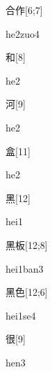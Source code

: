\begin{verbete}[he2zuo4]{合作}[6;7]
\begin{pronuncia}{he2zuo4}
\end{pronuncia}
\end{verbete}

\begin{verbete}[he2]{和}[8]
\begin{pronuncia}{he2}
\end{pronuncia}
\end{verbete}

\begin{verbete}[he2]{河}[9]
\begin{pronuncia}{he2}
\end{pronuncia}
\end{verbete}

\begin{verbete}[he2]{盒}[11]
\begin{pronuncia}{he2}
\end{pronuncia}
\end{verbete}

\begin{verbete}[hei1]{黑}[12]
\begin{pronuncia}{hei1}
\end{pronuncia}
\end{verbete}

\begin{verbete}{黑板}[12;8]
\begin{pronuncia}{hei1ban3}
\end{pronuncia}
\end{verbete}

\begin{verbete}[hei1se4]{黑色}[12;6]
\begin{pronuncia}{hei1se4}
\end{pronuncia}
\end{verbete}

\begin{verbete}[hen3]{很}[9]
\begin{pronuncia}{hen3}
\end{pronuncia}
\end{verbete}

